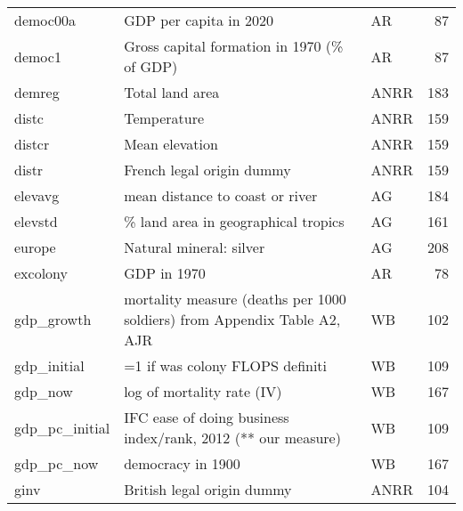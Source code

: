 \begin{tabular}{lllr}
democ00a                       &                                                    GDP per capita in 2020 &     AR &    87 \\
democ1                         &                                Gross capital formation in 1970 (\% of GDP) &     AR &    87 \\
demreg                         &                                                           Total land area &   ANRR &   183 \\
distc                          &                                                               Temperature &   ANRR &   159 \\
distcr                         &                                                            Mean elevation &   ANRR &   159 \\
distr                          &                                                 French legal origin dummy &   ANRR &   159 \\
elevavg                        &                                           mean distance to coast or river &     AG &   184 \\
elevstd                        &                                       \% land area in geographical tropics &     AG &   161 \\
europe                         &                                                   Natural mineral: silver &     AG &   208 \\
excolony                       &                                                               GDP in 1970 &     AR &    78 \\
gdp\_growth                     &  mortality measure (deaths per 1000 soldiers) from Appendix Table A2, AJR &     WB &   102 \\
gdp\_initial                    &                                           =1 if was colony FLOPS definiti &     WB &   109 \\
gdp\_now                        &                                                log of mortality rate (IV) &     WB &   167 \\
gdp\_pc\_initial                 &              IFC ease of doing business index/rank, 2012 (** our measure) &     WB &   109 \\
gdp\_pc\_now                     &                                                         democracy in 1900 &     WB &   167 \\
ginv                           &                                                British legal origin dummy &   ANRR &   104 \\

\end{tabular}
